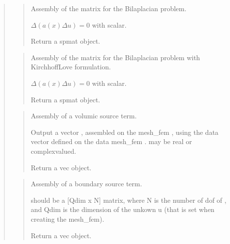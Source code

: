 \documentclass[a4paper,11pt,english]{sphinxmanual}
\begin{document}
\begin{quote}
\begin{quote}
\sphinxAtStartPar
Assembly of the matrix for the Bilaplacian problem.

\sphinxAtStartPar
\(\Delta(a(x)\Delta u) = 0\)   with  scalar.

\sphinxAtStartPar
Return a spmat object.
\end{quote}

\sphinxAtStartPar
{}
\begin{quote}

\sphinxAtStartPar
Assembly of the matrix for the Bilaplacian problem with Kirchhoff\sphinxhyphen{}Love formulation.

\sphinxAtStartPar
\(\Delta(a(x)\Delta u) = 0\)   with  scalar.

\sphinxAtStartPar
Return a spmat object.
\end{quote}

\sphinxAtStartPar
{}
\begin{quote}

\sphinxAtStartPar
Assembly of a volumic source term.

\sphinxAtStartPar
Output a vector , assembled on the mesh\_fem , using the data
vector  defined on the data mesh\_fem .  may be real or
complex\sphinxhyphen{}valued.

\sphinxAtStartPar
Return a vec object.
\end{quote}

\sphinxAtStartPar
{}
\begin{quote}

\sphinxAtStartPar
Assembly of a boundary source term.

\sphinxAtStartPar
{} should be a {[}Qdim x N{]} matrix, where N is the number of dof
of , and Qdim is the dimension of the unkown u (that is set
when creating the mesh\_fem).

\sphinxAtStartPar
Return a vec object.
\end{quote}


\end{quote}
\end{document}
